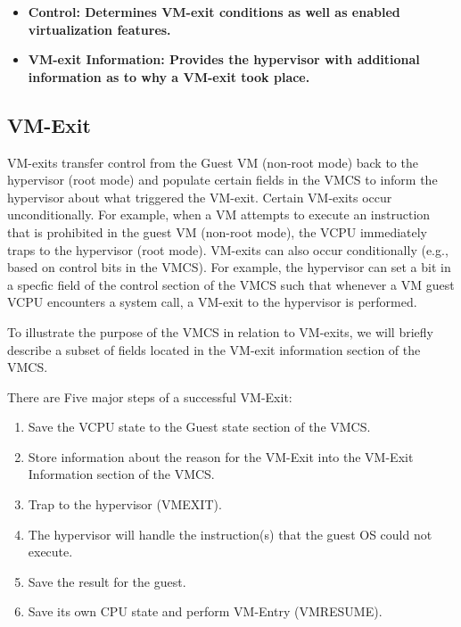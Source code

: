 \documentclass{report}
\begin{document}
\begin{spacing}{1.5}
{\begin{itemize}
    \item \bf{Control}: Determines VM-exit conditions as well as enabled virtualization features.

    \item \bf{VM-exit Information}: Provides the hypervisor with additional information as to why a VM-exit took place.
    \newline
\end{itemize}
}






\subsection{VM-Exit}
{\large
VM-exits transfer control from the Guest VM (non-root mode) back to the hypervisor (root mode) and populate certain fields in the VMCS to inform the hypervisor about what triggered the VM-exit. Certain VM-exits occur unconditionally. For example, when a VM attempts to execute an instruction that is prohibited in the guest VM (non-root mode), the VCPU immediately traps to the hypervisor (root mode). VM-exits can also occur conditionally (e.g., based on control bits in the VMCS). For example, the hypervisor can set a bit in a specfic field of the control section of the VMCS such that whenever a VM guest VCPU encounters a system call, a VM-exit to the hypervisor is performed.
\newline
}


{\large
To illustrate the purpose of the VMCS in relation to VM-exits, we will briefly describe a subset of fields located in the VM-exit information section of the VMCS.
\newline
}



There are Five major steps of a successful VM-Exit:
{\large
\begin{enumerate}
    \item Save the VCPU state to the Guest state section of the VMCS.
    \item Store information about the reason for the VM-Exit into the VM-Exit Information section of the VMCS.
    \item Trap to the hypervisor (VMEXIT).
    \item The hypervisor will handle the instruction(s) that the guest OS could not execute.
    \item Save the result for the guest.
    \item Save its own CPU state and perform VM-Entry (VMRESUME).
    \newline
\end{enumerate}
}


\end{spacing}
\end{document}
